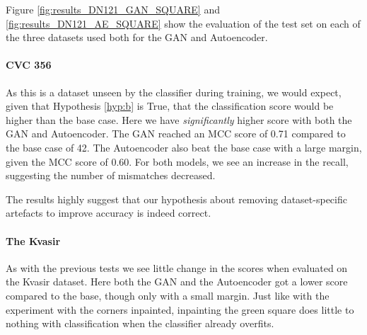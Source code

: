 Figure \ref{fig:results_DN121_GAN_SQUARE} and \ref{fig:results_DN121_AE_SQUARE} show the evaluation of the test set on each of the three datasets used both for the GAN and Autoencoder. 

\paragraph{CVC 356}
As this is a dataset unseen by the classifier during training, we would expect, given that Hypothesis \ref{hyp:b} is True, that the classification score would be higher than the base case.
Here we have \textit{significantly} higher score with both the GAN and Autoencoder. 
The GAN reached an MCC score of 0.71 compared to the base case of 42. The Autoencoder also beat the base case with a large margin, given the MCC score of 0.60. 
For both models, we see an increase in the recall, suggesting the number of mismatches decreased.

The results highly suggest that our hypothesis about removing dataset-specific artefacts to improve accuracy is indeed correct. 

\paragraph{The Kvasir}
As with the previous tests we see little change in the scores when evaluated on the Kvasir dataset.
Here both the GAN and the Autoencoder got a lower score compared to the base, though only with a small margin. Just like with the experiment with the corners inpainted, inpainting the green square does little to nothing with classification when the classifier already overfits.


